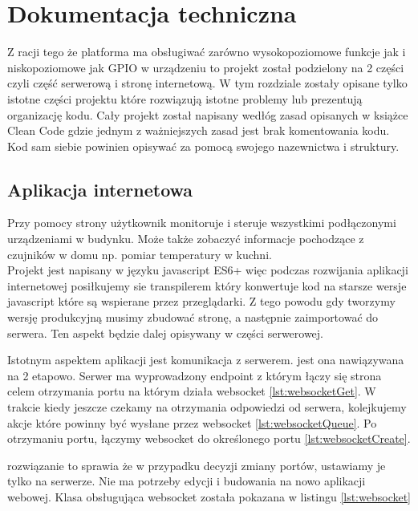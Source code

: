 \chapter{Dokumentacja techniczna}%
Z racji tego że platforma ma obsługiwać zarówno wysokopoziomowe funkcje jak i niskopoziomowe jak GPIO w urządzeniu to projekt został podzielony na 2 części czyli część serwerową i stronę internetową. W tym rozdziale zostały opisane tylko istotne  części projektu które rozwiązują istotne problemy lub prezentują organizację kodu. Cały projekt został napisany wedłóg zasad opisanych w książce Clean Code gdzie jednym z ważniejszych zasad jest brak komentowania kodu. Kod sam siebie powinien opisywać za pomocą swojego nazewnictwa i struktury.  
\section{Aplikacja internetowa}
Przy pomocy strony użytkownik monitoruje i steruje wszystkimi podłączonymi urządzeniami w budynku. Może także zobaczyć informacje pochodzące z czujników w domu np. pomiar temperatury w kuchni. \\
Projekt jest napisany w języku javascript ES6+ więc podczas rozwijania aplikacji internetowej posiłkujemy sie transpilerem który konwertuje kod na starsze wersje javascript które są wspierane przez przeglądarki. Z tego powodu gdy tworzymy wersję produkcyjną musimy zbudować stronę, a następnie zaimportować do serwera. Ten aspekt będzie dalej opisywany w części serwerowej.
\par Istotnym aspektem aplikacji jest komunikacja z serwerem. jest ona nawiązywana na 2 etapowo.
Serwer ma wyprowadzony endpoint z którym łączy się strona celem otrzymania portu na którym działa websocket \ref{lst:websocketGet}. W trakcie kiedy jeszcze czekamy na otrzymania odpowiedzi od serwera, kolejkujemy akcje które powinny być wysłane przez websocket \ref{lst:websocketQueue}. Po otrzymaniu portu, łączymy websocket do określonego portu \ref{lst:websocketCreate}. 
\par rozwiązanie to sprawia że w przypadku decyzji zmiany portów, ustawiamy je tylko na serwerze. Nie ma potrzeby edycji i budowania na nowo aplikacji webowej. Klasa obsługująca websocket została pokazana w listingu \ref{lst:websocket}
\newpage
